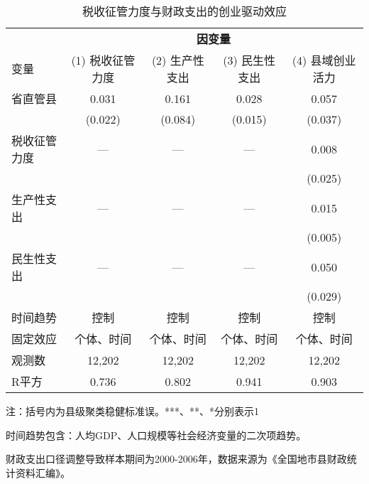 \begin{table}[htbp]
\footnotesize
\centering
\caption{税收征管力度与财政支出的创业驱动效应}\label{tab:mechanism}
\begin{threeparttable}
\begin{tabular}{l*{4}{c}}
\toprule
 & \multicolumn{4}{c}{\textbf{因变量}} \\
\cmidrule(lr){2-5}
变量 & (1) 税收征管力度 & (2) 生产性支出 & (3) 民生性支出 & (4) 县域创业活力 \\
\midrule
省直管县 & 0.031 & 0.161\tnote{**} & 0.028\tnote{*} & 0.057\tnote{**} \\
 & (0.022) & (0.084) & (0.015) & (0.037) \\
\addlinespace[2pt]
税收征管力度 & — & — & — & 0.008 \\
 &  &  &  & (0.025) \\
生产性支出 & — & — & — & 0.015\tnote{***} \\
 &  &  &  & (0.005) \\
民生性支出 & — & — & — & 0.050\tnote{*} \\
 &  &  &  & (0.029) \\
\midrule
时间趋势 & 控制 & 控制 & 控制 & 控制 \\
固定效应 & 个体、时间 & 个体、时间 & 个体、时间 & 个体、时间 \\
观测数 & 12,202 & 12,202 & 12,202 & 12,202 \\
R平方 & 0.736 & 0.802 & 0.941 & 0.903 \\
\bottomrule
\end{tabular}

\begin{tablenotes}
\scriptsize
\item 注：括号内为县级聚类稳健标准误。***、**、*分别表示1%
\item 时间趋势包含：人均GDP、人口规模等社会经济变量的二次项趋势。
\item 财政支出口径调整导致样本期间为2000-2006年，数据来源为《全国地市县财政统计资料汇编》。
\end{tablenotes}
\end{threeparttable}
\end{table}
